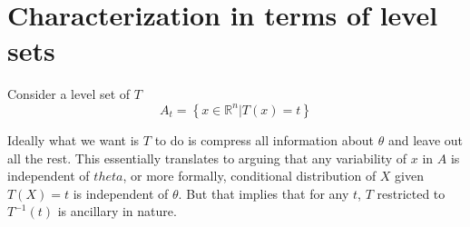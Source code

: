 \documentclass[oneside]{book}
\begin{document}
\begin{center}

\end{center}


\section{Characterization in terms of level sets}
Consider a level set of $T$
$$A_t=\left\{x\in\mathbb R^n|T(x)=t \right\}$$

Ideally what we want is $T$ to do is compress all information about $\theta$ and leave out all the rest. This essentially translates to arguing that any variability of $x$ in $A$ is independent of $theta$, or more formally,  conditional distribution of $X$ given $T(X)=t$ is independent of $\theta$. But that implies that for any $t$, $T$ restricted to $T^{-1}(t)$ is ancillary in nature.
\end{document}
